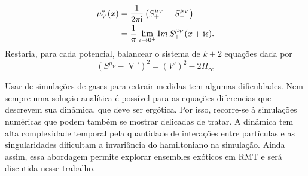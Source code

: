 \documentclass[11pt,twocolumn]{article}
\DeclareMathOperator{\Df}{D}
\DeclareMathOperator{\Qf}{Q}
\DeclareMathOperator{\V}{V}
\renewcommand{\Im}{\mathop{\textrm Im}}
\newcommand{\ii}{\mathrm{i}}
\numberwithin{equation}{section} %
\begin{document}
\begin{equation}
	\begin{split}
		\mu^{*}_{V}(x) 
		&= \frac{1}{2\pi \ii} \left( S^{\mu_V}_{+} -  S^{\mu_V}_{-}\right) \\
		&= \frac{1}{\pi} \lim_{\epsilon \to 0^+} \Im{S^{\mu_V}_{+}(x + \ii\epsilon)}.
	\end{split}
	\label{Equation: p(lambda)}
\end{equation}
Restaria, para cada potencial, balancear o sistema de $k+2$ equações dada por
\[
\left( S^{\mu_{V}} - \V' \right)^2 = \left( V' \right)^2 - 2 \Pi_{\infty}
\]

Usar de simulações de gases para extrair medidas tem algumas dificuldades. Nem sempre uma solução analítica é possível para as equações diferencias que descrevem sua dinâmica, que deve ser ergótica. Por isso, recorre-se à simulações numéricas que podem também se mostrar delicadas de tratar. A dinâmica tem alta complexidade temporal pela quantidade de interações entre partículas e as singularidades dificultam a invariância do hamiltoniano na simulação. Ainda assim, essa abordagem permite explorar ensembles exóticos em RMT e será discutida nesse trabalho.
\end{document}
